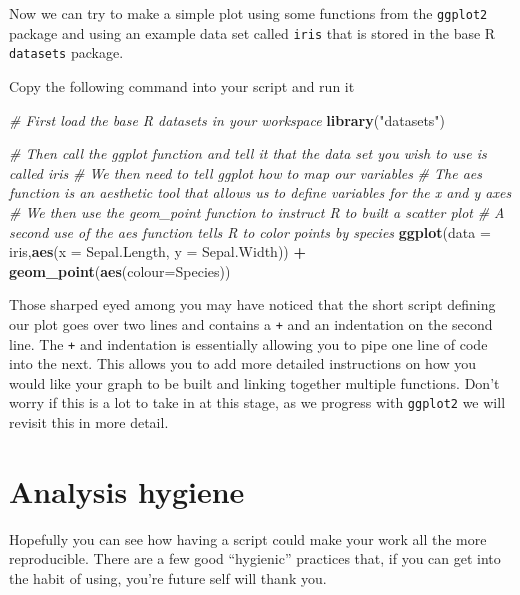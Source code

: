 \documentclass[
]{book}
\newenvironment{Shaded}{\begin{snugshade}}{\end{snugshade}}
\newcommand{\AttributeTok}[1]{\textcolor[rgb]{0.13,0.29,0.53}{#1}}
\newcommand{\CommentTok}[1]{\textcolor[rgb]{0.56,0.35,0.01}{\textit{#1}}}
\newcommand{\FunctionTok}[1]{\textcolor[rgb]{0.13,0.29,0.53}{\textbf{#1}}}
\newcommand{\NormalTok}[1]{#1}
\newcommand{\SpecialCharTok}[1]{\textcolor[rgb]{0.81,0.36,0.00}{\textbf{#1}}}
\newcommand{\StringTok}[1]{\textcolor[rgb]{0.31,0.60,0.02}{#1}}
\begin{document}
Now we can try to make a simple plot using some functions from the \texttt{ggplot2} package and using an example data set called \texttt{iris} that is stored in the base R \texttt{datasets} package.

Copy the following command into your script and run it

\begin{Shaded}
\begin{Highlighting}[]
\CommentTok{\# First load the base R datasets in your workspace}
\FunctionTok{library}\NormalTok{(}\StringTok{"datasets"}\NormalTok{)}

\CommentTok{\# Then call the ggplot function and tell it that the data set you wish to use is called iris}
\CommentTok{\# We then need to tell ggplot how to map our variables}
\CommentTok{\# The aes function is an aesthetic tool that allows us to define variables for the x and y axes}
\CommentTok{\# We then use the geom\_point function to instruct R to built a scatter plot}
\CommentTok{\# A second use of the aes function tells R to color points by species}
\FunctionTok{ggplot}\NormalTok{(}\AttributeTok{data =}\NormalTok{ iris,}\FunctionTok{aes}\NormalTok{(}\AttributeTok{x =}\NormalTok{ Sepal.Length, }\AttributeTok{y =}\NormalTok{ Sepal.Width)) }\SpecialCharTok{+} 
  \FunctionTok{geom\_point}\NormalTok{(}\FunctionTok{aes}\NormalTok{(}\AttributeTok{colour=}\NormalTok{Species)) }
\end{Highlighting}
\end{Shaded}

Those sharped eyed among you may have noticed that the short script defining our plot goes over two lines and contains a \texttt{+} and an indentation on the second line. The \texttt{+} and indentation is essentially allowing you to pipe one line of code into the next. This allows you to add more detailed instructions on how you would like your graph to be built and linking together multiple functions. Don't worry if this is a lot to take in at this stage, as we progress with \texttt{ggplot2} we will revisit this in more detail.

\hypertarget{analysis-hygiene}{%
\section{Analysis hygiene}\label{analysis-hygiene}}

Hopefully you can see how having a script could make your work all the more reproducible. There are a few good ``hygienic'' practices that, if you can get into the habit of using, you're future self will thank you.
\end{document}
